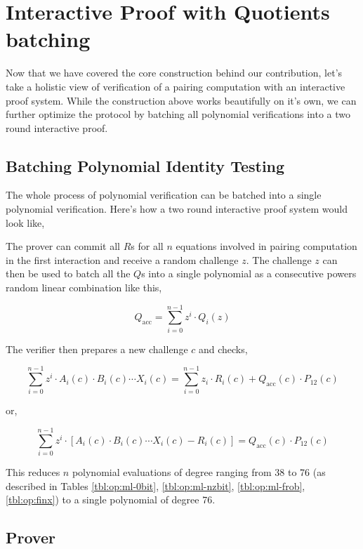 \section{Interactive Proof with Quotients batching}

Now that we have covered the core construction behind our contribution, let's take a holistic view of verification of a pairing computation with an interactive proof system. While the construction above works beautifully on it's own, we can further optimize the protocol by batching all polynomial verifications into a two round interactive proof.

\subsection{Batching Polynomial Identity Testing} \label{sec:iop:batching}

The whole process of polynomial verification can be batched into a single polynomial verification. Here's how a two round interactive proof system would look like,

The prover can commit all $R$s for all $n$ equations involved in pairing computation in the first interaction and receive a random challenge $z$. The challenge $z$ can then be used to batch all the $Q$s into a single polynomial as a consecutive powers random linear combination like this,

$$Q_\text{acc} = \sum_{i=0}^{n - 1}z^i \cdot Q_i(z)$$

The verifier then prepares a new challenge $c$ and checks,

$$\sum_{i=0}^{n - 1}z^i \cdot A_i(c) \cdot B_i(c) \cdots X_i(c) = \sum_{i=0}^{n-1}{z_i \cdot R_i(c) + Q_\text{acc}(c) \cdot P_{12}(c)}$$

or,

\begin{equation}
    \label{eq:iop-batched}
    \sum_{i=0}^{n - 1}z^i \cdot [A_i(c) \cdot B_i(c) \cdots X_i(c) - R_i(c)] = Q_\text{acc}(c) \cdot P_{12}(c)
\end{equation}

This reduces $n$ polynomial evaluations of degree ranging from 38 to 76 (as described in Tables \ref{tbl:op:ml-0bit}, \ref{tbl:op:ml-nzbit}, \ref{tbl:op:ml-frob}, \ref{tbl:op:finx}) to a single polynomial of degree 76.

\subsection{Prover}

